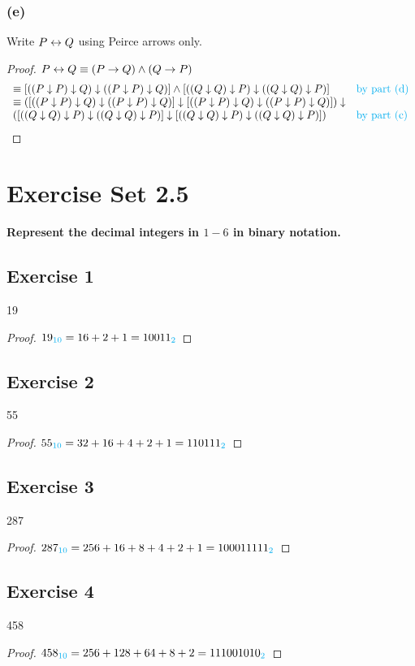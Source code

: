 \documentclass[14pt]{extarticle}
\newcommand{\base}[1]{{\color{cyan}#1}} \newcommand{\da}{\downarrow}
\begin{document}
\subsubsection{(e)} Write $P \leftrightarrow Q$ using Peirce arrows only.
\begin{proof} $P \leftrightarrow Q \equiv (P \to Q)\wedge(Q \to P)$ $$ \begin{array}{ll}
\equiv [((P \da P) \da Q) \da ((P \da P) \da Q)] \wedge [((Q \da Q) \da P) \da
((Q \da Q) \da P)] & \text{\color{cyan}by part (d)} \\ \equiv ([((P \da P) \da
Q) \da ((P \da P) \da Q)] \da [((P \da P) \da Q) \da ((P \da P) \da Q)]) \da &
\\ ([((Q \da Q) \da P) \da ((Q \da Q) \da P)] \da [((Q \da Q) \da P) \da ((Q \da
Q) \da P)]) & \text{\color{cyan}by part (c)} \\ \end{array} $$ \end{proof}

\section{Exercise Set 2.5} {\bf \color{cyan} Represent the decimal integers in
$1-6$ in binary notation.}

\subsection{Exercise 1} 19
\begin{proof} $19_\base{10} = 16 + 2 + 1 = 10011_\base{2}$ \end{proof}
\subsection{Exercise 2} 55
\begin{proof} $55_\base{10} = 32 + 16 + 4 + 2 + 1 = 110111_\base{2}$ \end{proof}
\subsection{Exercise 3} 287
\begin{proof} $287_\base{10} = 256 + 16 + 8 + 4 + 2 + 1 = 100011111_\base{2}$
\end{proof}

\subsection{Exercise 4} 458
\begin{proof} $458_\base{10} = 256 + 128 + 64 + 8 + 2 = 111001010_\base{2}$
\end{proof}
\end{document}
